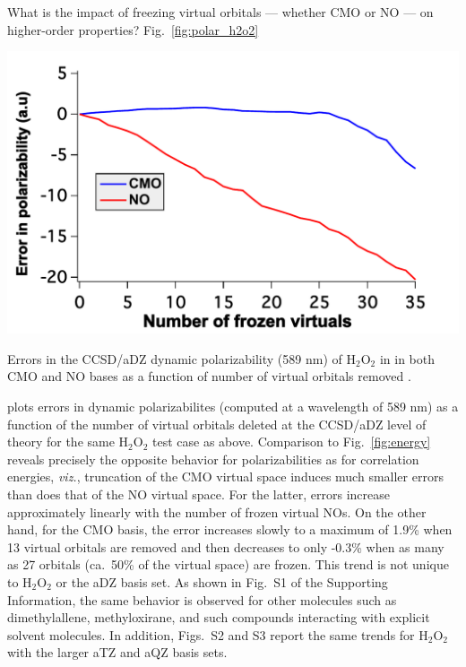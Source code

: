 What is the impact of freezing virtual orbitals --- whether CMO or NO --- on
higher-order properties?  Fig.~\ref{fig:polar_h2o2} 
\begin{MyFigure}[h!]
\centering
\includegraphics[width=0.6\linewidth]{figures_fvno/h2o2_polar.pdf}
\caption{{\footnotesize Errors in the CCSD/aDZ dynamic polarizability (589 nm) of H$_2$O$_2$ in
       in both CMO and NO bases as a function of number of virtual orbitals removed .}}
\label{fig:polar_h2o2}
\end{MyFigure}
plots errors in dynamic polarizabilites (computed at a wavelength of 589 nm) as a function of the
number of virtual orbitals deleted at the CCSD/aDZ level of theory for the
same H$_2$O$_2$ test case as above.  Comparison to Fig.\ \ref{fig:energy}
reveals precisely the opposite behavior for polarizabilities as for
correlation energies, {\em viz.}, truncation of the CMO virtual space induces
much smaller errors than does that of the NO virtual space.  For the latter,
errors increase approximately linearly with the number of frozen virtual NOs.
On the other hand, for the CMO basis, the error increases slowly to a maximum
of 1.9\% when 13 virtual orbitals are removed and then decreases to only
-0.3\% when as many as 27 orbitals (ca.\ 50\% of the virtual space) are
frozen.  This trend is not unique to H$_2$O$_2$ or the aDZ basis set. As shown
in Fig.~S1 of the Supporting Information, the same behavior is observed for
other molecules such as dimethylallene, methyloxirane, and such compounds
interacting with explicit solvent molecules.  In addition, Figs.~S2 and S3
report the same trends for H$_2$O$_2$ with the larger aTZ and aQZ basis sets.


